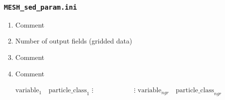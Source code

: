 \documentclass{beamer}
\newcounter{ResumeEnumerate}
\begin{document}
\begin{frame}\frametitle{\texttt{MESH\_sed\_param.ini}}
{\tiny
\begin{enumerate}[start=\numexpr\value{ResumeEnumerate}+1, label=Line \arabic*]\itemsep0em 
\item Comment
\item Number of output fields (gridded data)
\item Comment
\item Comment
\parbox{\textwidth}{
$\text{variable}_1 \quad \text{particle\_class}_1$ \newline
$\vdots \quad\quad\quad\quad\quad\quad \vdots$ \newline
$\text{variable}_{ngr} \quad \text{particle\_class}_{ngr} $
}
\end{enumerate}
}
\end{frame}


%
\end{document}
